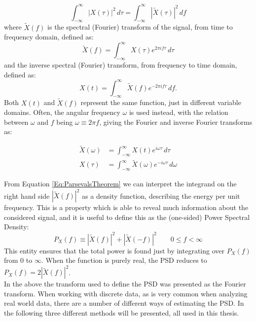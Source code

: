 \documentclass[../../CompleteThesis/Complete_1stDraft]{subfiles}
\begin{document}
\begin{equation}
	\int_{-\infty}^{\infty} |X(\tau)|^2 \, d\tau = \int_{-\infty}^{\infty} |\tilde{X}(\tau)|^2\, df
	\label{Eq:ParsevalsTheorem}
\end{equation}
where $\tilde{X}(f)$ is the spectral (Fourier) transform of the signal, from time to frequency domain, defined as:
\begin{equation}
	\tilde{X}(f) = \int_{-\infty}^{\infty} X(\tau) e^{2\pi i f \tau} \, d\tau
	\label{Eq:FourierTransform}
\end{equation}
and the inverse spectral (Fourier) transform, from frequency to time domain, defined as:
\begin{equation}
	X(t) = \int_{-\infty}^{\infty} \tilde{X}(f) e^{-2\pi i f \tau}\, df.
	\label{Eq:InverseFourierTransform}
\end{equation}
Both $X(t)$ and $\tilde{X}(f)$ represent the same function, just in different variable domains. Often, the angular frequency $\omega$ is used instead, with the relation between $\omega$ and $f$ being $\omega \equiv 2\pi f $, giving the Fourier and inverse Fourier transforms as:

\begin{equation}
	\begin{aligned}
		\tilde{X}(\omega) &= \int_{-\infty}^{\infty} X(t) e^{i\omega\tau}\, d\tau \\
		X(\tau) &= \int_{-\infty}^{\infty} \tilde{X}(\omega) e^{-i\omega\tau}\, d\omega
		\label{Eq:FourierTransformAngular}
	\end{aligned} 
\end{equation}

From Equation \ref{Eq:ParsevalsTheorem} we can interpret the integrand on the right hand side $|\tilde{X}(f)|^2$ as a density function, describing the energy per unit frequency. This is a property which is able to reveal much information about the considered signal, and it is useful to define this as the (one-sided) Power Spectral Density: 
\begin{equation}
	P_X(f) \equiv |\tilde{X}(f)|^2 + |\tilde{X}(-f)|^2 \qquad 0 \leq f < \infty
\end{equation}
This entity ensures that the total power is found just by integrating over $P_X(f)$ from 0 to $\infty$. When the function is purely real, the PSD reduces to $P_X(f) = 2|\tilde{X}(f)|^2$.\\
In the above the transform used to define the PSD was presented as the Fourier transform. When working with discrete data, as is very common when analyzing real world data, there are a number of different ways of estimating the PSD. In the following three different methods will be presented, all used in this thesis.
\newline
\end{document}
